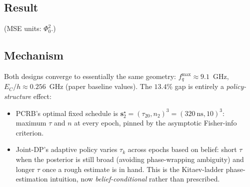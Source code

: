 \documentclass[11pt,a4paper]{article}
\newcommand{\Phizero}{\Phi_0}
\begin{document}
\subsection{Result}

\begin{center}
\end{center}
(MSE units: $\Phizero^2$.)

\subsection{Mechanism}

Both designs converge to essentially the same geometry: $f_q^{\max} \approx 9.1$~GHz, $E_C/h \approx 0.256$~GHz (paper baseline values).  The $13.4\%$ gap is entirely a \emph{policy-structure} effect:
\begin{itemize}[nosep, leftmargin=2em]
  \item PCRB's optimal fixed schedule is $\bm s^\star_2 = (\tau_{20}, n_2)^3 = (320~\mathrm{ns}, 10)^3$: maximum $\tau$ and $n$ at every epoch, pinned by the asymptotic Fisher-info criterion.
  \item Joint-DP's adaptive policy varies $\tau_k$ across epochs based on belief: short $\tau$ when the posterior is still broad (avoiding phase-wrapping ambiguity) and longer $\tau$ once a rough estimate is in hand.  This is the Kitaev-ladder phase-estimation intuition, now \emph{belief-conditional} rather than prescribed.
\end{itemize}
\end{document}
